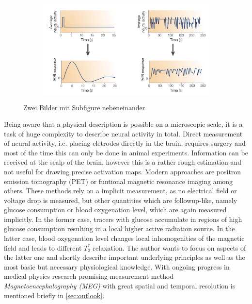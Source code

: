 \documentclass[a4paper]{scrartcl}
\begin{document}
\begin{figure}[hbt]
\begin{subfigure}[l]{0.35\textwidth}
  \end{subfigure}
  \begin{subfigure}[r]{0.6\textwidth}
    \includegraphics[width = \textwidth]{pictures/signalProcessing.png}
    \end{subfigure}
  \caption{Zwei Bilder mit Subfigure nebeneinander.}
\end{figure}
Being aware that a physical description is possible on a microscopic scale, it is a task of huge complexity to describe neural activity in total.
Direct measurement of neural activity, i.e. placing eletrodes directly in the brain, requires surgery and most of the time this can only be done in animal experiments. 
Information can be received at the scalp of the brain, however this is a rather rough estimation and not useful for drawing precise activation maps.\cite[6]{buxton}
Modern approaches are positron emission tomography (PET) or funtional magnetic resonance imaging among others.
These methods rely on a implicit measurement, as no electrical field or voltage drop is measured, but other quantities which are followup-like, namely glucose consumption or blood oxygenation level, which are again measured implicitly.
In the former case, tracers with glucose accumulate in regions of high glucose consumption resulting in a local higher active radiation source.
In the latter case, blood oxygenation level changes local inhomogenities of the magnetic field and leads to different \textit{$T_2^*$} relaxation.
The author wants to focus on aspects of the latter one and shortly describe important underlying principles as well as the most basic but necessary physiological knowledge.
With ongoing progress in medical physics research promising measurement method \textit{Magnetoencephalography (MEG)} with great spatial and temporal resolution is mentioned briefly in \ref{sec:outlook}. 
\end{document}
